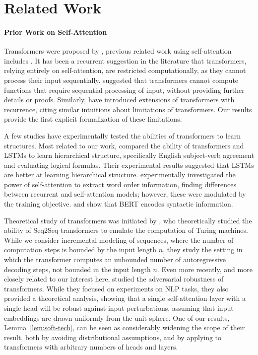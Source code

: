 \documentclass[11pt,a4paper]{article}
\begin{document}
\section{Related Work}\label{sec:related}
\paragraph{Prior Work on Self-Attention}
Transformers were proposed by \citet{vaswani2017attention}, previous related work using self-attention includes \citet{cheng2016long,parikh2016decomposable,paulus2017deep,lin2017structured}.
It has been a recurrent suggestion in the literature that transformers, relying entirely on self-attention, are restricted computationally, as they cannot process their input sequentially.
\citet{dehghani2018universal} suggested that %
transformers cannot compute functions that require sequential processing of input, without providing further details or proofs.
Similarly, \citet{shen2018disan,chen2018best,hao2019modeling} have introduced extensions of transformers with recurrence, citing similar intuitions about limitations of transformers.
Our results provide the first explicit formalization of these limitations.

A few studies have experimentally tested the abilities of transformers to learn structures.
Most related to our work, \citet{tran2018importance} compared the ability of transformers and LSTMs to learn hierarchical structure, specifically English subject-verb agreement and evaluating logical formulas.
Their experimental results suggested that LSTMs are better at learning hierarchical structure.
\citet{yang2019assessing} experimentally investigated the power of self-attention to extract word order information, finding differences between recurrent and self-attention models; however, these were modulated by the training objective.
\citet{lin2019open} and \citet{tenney2019bert} show that BERT \cite{devlin2018bert} encodes syntactic information.

Theoretical study of transformers was initiated by \citet{perez2019turing}, who theoretically studied the ability of Seq2Seq transformers to emulate the computation of Turing machines.
While we consider incremental modeling of sequences, where the number of computation steps is bounded by the input length $n$, they study the setting in which the transformer computes an unbounded number of autoregressive decoding steps, not bounded in the input length $n$.
Even more recently, and more closely related to our interest here, \citet{hsieh2019robustness} studied the adversarial robustness of transformers.
While they focused on experiments on NLP tasks, they also provided a theoretical analysis, showing that a single self-attention layer with a single head will be robust against input perturbations, assuming that input embeddings are drawn uniformly from the unit sphere.
One of our results, Lemma~\ref{lem:soft-tech}, can be seen as considerably widening the scope of their result, both by avoiding distributional assumptions, and by applying to transformers with arbitrary numbers of heads and layers.
\end{document}
